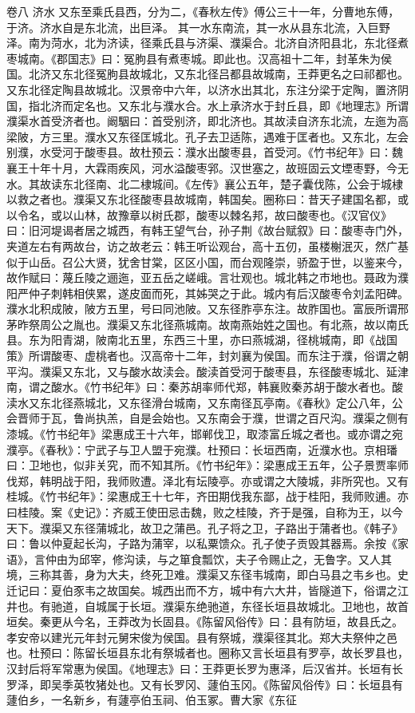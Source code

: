 \documentclass[12pt,UTF8]{ctexbook}
\begin{document}
卷八 济水 
又东至乘氏县西，分为二，《春秋左传》傅公三十一年，分曹地东傅，于济。济水自是东北流，出巨泽。
其一水东南流，其一水从县东北流，入巨野泽。南为菏水，北为济读，径乘氏县与济渠、濮渠合。北济自济阳县北，东北径煮枣城南。《郡国志》曰：冤朐县有煮枣城。即此也。汉高祖十二年，封革朱为侯国。北济又东北径冤朐县故城北，又东北径吕都县故城南，王莽更名之曰祁都也。又东北径定陶县故城北。汉景帝中六年，以济水出其北，东注分梁于定陶，置济阴国，指北济而定名也。又东北与濮水合。水上承济水于封丘县，即《地理志》所谓濮渠水首受济者也。阚駰曰：首受别济，即北济也。其故渎自济东北流，左迤为高梁陂，方三里。濮水又东径匡城北。孔子去卫适陈，遇难于匡者也。又东北，左会别濮，水受河于酸枣县。故杜预云：濮水出酸枣县，首受河。《竹书纪年》曰：魏襄王十年十月，大霖雨疾风，河水溢酸枣郛。汉世塞之，故班固云文堙枣野，今无水。其故读东北径南、北二棣城间。《左传》襄公五年，楚子囊伐陈，公会于城棣以救之者也。濮渠又东北径酸枣县故城南，韩国矣。圈称曰：昔天子建国名都，或以令名，或以山林，故豫章以树氏郡，酸枣以棘名邦，故曰酸枣也。《汉官仪》曰：旧河堤谒者居之城西，有韩王望气台，孙子荆《故台赋叙》曰：酸枣寺门外，夹道左右有两故台，访之故老云：韩王听讼观台，高十五仞，虽楼榭泯灭，然广基似于山岳。召公大贤，犹舍甘棠，区区小国，而台观隆崇，骄盈于世，以鉴来今，故作赋曰：蔑丘陵之逦迤，亚五岳之嵯峨。言壮观也。城北韩之市地也。聂政为濮阳严仲子刺韩相侠累，遂皮面而死，其姊哭之于此。城内有后汉酸枣令刘孟阳碑。濮水北积成陂，陂方五里，号曰同池陂。又东径胙亭东注。故胙国也。富辰所谓邢茅昨祭周公之胤也。濮渠又东北径燕城南。故南燕始姓之国也。有北燕，故以南氏县。东为阳青湖，陂南北五里，东西三十里，亦曰燕城湖，径桃城南，即《战国策》所谓酸枣、虚桃者也。汉高帝十二年，封刘襄为侯国。而东注于濮，俗谓之朝平沟。濮渠又东北，又与酸水故渎会。酸渎首受河于酸枣县，东径酸枣城北、延津南，谓之酸水。《竹书纪年》曰：秦苏胡率师代郑，韩襄败秦苏胡于酸水者也。酸渎水又东北径燕城北，又东径滑台城南，又东南径瓦亭南。《春秋》定公八年，公会晋师于瓦，鲁尚执羔，自是会始也。又东南会于濮，世谓之百尺沟。濮渠之侧有漆城。《竹书纪年》梁惠成王十六年，邯郸伐卫，取漆富丘城之者也。或亦谓之宛濮亭。《春秋》：宁武子与卫人盟于宛濮。杜预曰：长垣西南，近濮水也。京相璠曰：卫地也，似非关究，而不知其所。《竹书纪年》：梁惠成王五年，公子景贾率师伐郑，韩明战于阳，我师败遭。泽北有坛陵亭。亦或谓之大陵城，非所究也。又有桂城。《竹书纪年》：梁惠成王十七年，齐田期伐我东鄙，战于桂阳，我师败逋。亦曰桂陵。案《史记》：齐威王使田忌击魏，败之桂陵，齐于是强，自称为王，以今天下。濮渠又东径蒲城北，故卫之蒲邑。孔子将之卫，子路出于蒲者也。《韩子》曰：鲁以仲夏起长沟，子路为蒲宰，以私粟馈众。孔子使子贡毁其器焉。余按《家语》，言仲由为邱宰，修沟读，与之箪食瓢饮，夫子令赐止之，无鲁字。又人其境，三称其善，身为大夫，终死卫难。濮渠又东径韦城南，即白马县之韦乡也。史迁记曰：夏伯豕韦之故国矣。城西出而不方，城中有六大井，皆隧道下，俗谓之江井也。有驰道，自城属于长垣。濮渠东绝驰道，东径长垣县故城北。卫地也，故首垣矣。秦更从今名，王莽改为长固县。《陈留风俗传》曰：县有防垣，故县氏之。孝安帝以建光元年封元舅宋俊为侯国。县有祭城，濮渠径其北。郑大夫祭仲之邑也。杜预曰：陈留长垣县东北有祭城者也。圈称又言长垣县有罗亭，故长罗县也，汉封后将军常惠为侯国。《地理志》曰：王莽更长罗为惠泽，后汉省并。长垣有长罗泽，即吴季英牧猪处也。又有长罗冈、蘧伯玉冈。《陈留风俗传》曰：长垣县有蘧伯乡，一名新乡，有蘧亭伯玉祠、伯玉冢。曹大家《东征
\end{document}
